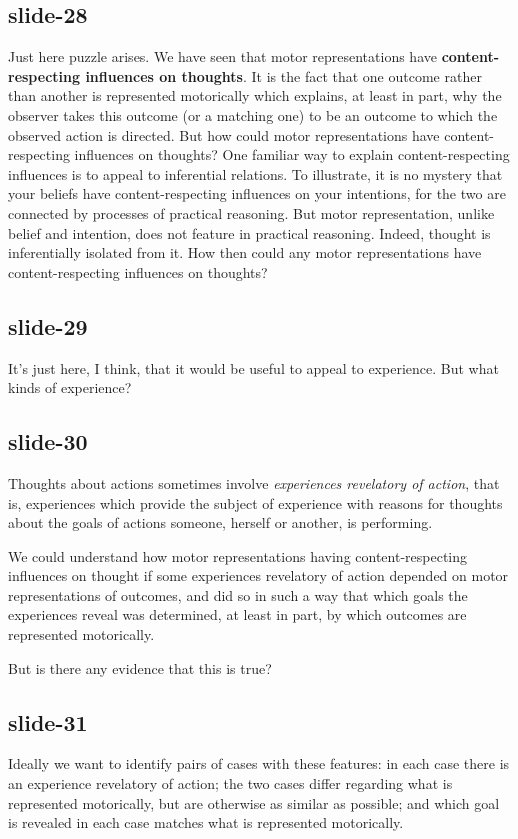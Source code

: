\documentclass[12pt,\papersize]{extarticle}
\begin{document}
\subsection{slide-28}
Just here puzzle arises.
We have seen that motor representations have
\textbf{content-respecting influences on thoughts}. It is the fact that one outcome rather
than another
is represented motorically which explains, at least in part, why the observer takes this
outcome (or a matching one) to be an outcome to which the observed action is directed. But how
could motor representations have content-respecting influences on thoughts? One familiar way
to explain content-respecting influences is to appeal to inferential relations. To illustrate,
it is no mystery that your beliefs have content-respecting influences on your intentions, for
the two are connected by processes of practical reasoning. But motor representation, unlike
belief and intention, does not feature in practical reasoning. Indeed, thought is
inferentially isolated from it. How then could any motor representations have
content-respecting influences on thoughts?

\subsection{slide-29}
It’s just here, I think, that it would be useful to appeal to experience.
But what kinds of experience?

\subsection{slide-30}
Thoughts about actions sometimes involve \emph{experiences revelatory of action}, that is,
experiences which provide the subject of experience with reasons for thoughts about the
goals of actions someone, herself or another, is performing.

We could understand how motor representations having content-respecting
influences on thought if
some experiences revelatory of action depended on motor representations of outcomes, and
did so in
such a way that which goals the experiences reveal was determined, at least in part, by which
outcomes are represented motorically.

But is there any evidence that this is true?

\subsection{slide-31}
Ideally we want to identify pairs of cases with these features: in each case there is an experience
revelatory of action; the two cases differ regarding what is represented motorically, but are
otherwise as similar as possible; and which goal is revealed in each case matches what is
represented motorically.
\end{document}
